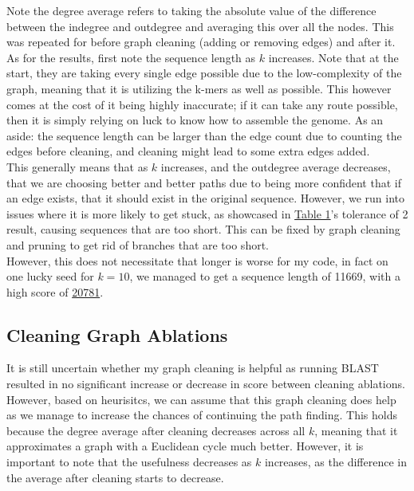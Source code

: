 \documentclass[10pt]{article}
\begin{document}
Note the degree average refers to taking the absolute value of the difference between the indegree and outdegree and averaging this over all the nodes. This was repeated for before graph cleaning (adding or removing edges) and after it.\\

As for the results, first note the sequence length as $k$ increases. Note that at the start, they are taking every single edge possible due to the low-complexity of the graph, meaning that it is utilizing the k-mers as well as possible. This however comes at the cost of it being highly inaccurate; if it can take any route possible, then it is simply relying on luck to know how to assemble the genome. As an aside: the sequence length can be larger than the edge count due to counting the edges before cleaning, and cleaning might lead to some extra edges added.\\

This generally means that as $k$ increases, and the outdegree average decreases, that we are choosing better and better paths due to being more confident that if an edge exists, that it should exist in the original sequence. However, we run into issues where it is more likely to get stuck, as showcased in \hyperref[tab:table_1]{Table 1}'s tolerance of 2 result, causing sequences that are too short. This can be fixed by graph cleaning and pruning to get rid of branches that are too short.\\

However, this does not necessitate that longer is worse for my code, in fact on one lucky seed for $k=10$, we managed to get a sequence length of 11669, with a high score of \hyperref[fig:figure_7]{20781}.

\subsection*{Cleaning Graph Ablations}
It is still uncertain whether my graph cleaning is helpful as running BLAST resulted in no significant increase or decrease in score between cleaning ablations. However, based on heurisitcs, we can assume that this graph cleaning does help as we manage to increase the chances of continuing the path finding. This holds because the degree average after cleaning decreases across all $k$, meaning that it approximates a graph with a Euclidean cycle much better. However, it is important to note that the usefulness decreases as $k$ increases, as the difference in the average after cleaning starts to decrease.
\end{document}
